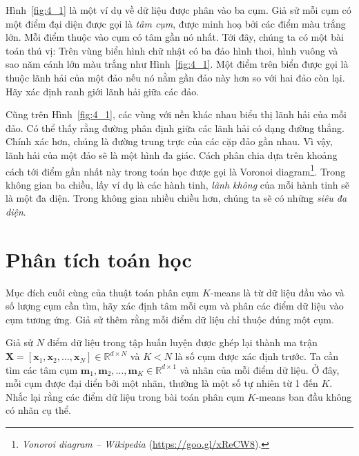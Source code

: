 Hình~\ref{fig:4_1} là một ví dụ về dữ liệu được phân vào ba cụm. Giả sử mỗi cụm
có một điểm đại diện được gọi là \textit{tâm cụm}, được minh hoạ bởi các điểm
màu trắng lớn. Mỗi điểm thuộc vào cụm có tâm gần nó nhất. Tới đây, chúng ta có
một bài toán thú vị: {Trên vùng biển hình chữ nhật có ba đảo hình thoi, hình
vuông và sao năm cánh lớn màu trắng như Hình~\ref{fig:4_1}. Một điểm trên biển
được gọi là thuộc lãnh hải của một đảo nếu nó nằm gần đảo này hơn so với hai đảo
còn lại. Hãy xác định ranh giới lãnh hải giữa các đảo.}

Cũng trên Hình~\ref{fig:4_1}, các vùng với nền khác nhau biểu thị lãnh hải của
mỗi đảo. Có thể thấy rằng đường phân định giữa các lãnh hải có dạng đường
thẳng. Chính xác hơn, chúng là đường trung trực của các cặp đảo gần nhau. Vì
vậy, lãnh hải của một đảo sẽ là một hình đa giác. Cách phân chia dựa trên khoảng
cách tới điểm gần nhất này trong toán học được gọi là Voronoi
diagram\footnote{\textit{Vonoroi diagram -- Wikipedia}
(\url{https://goo.gl/xReCW8}).}. Trong không gian ba chiều, lấy ví dụ là các
hành tinh, \textit{lãnh không} của mỗi hành tinh sẽ là một đa diện. Trong không
gian nhiều chiều hơn, chúng ta sẽ có những \textit{siêu đa diện}.




\section{Phân tích toán học }

Mục đích cuối cùng của thuật toán phân cụm $K$-means là từ dữ liệu đầu vào và số
lượng cụm cần tìm, hãy xác định tâm mỗi cụm và phân các điểm dữ liệu vào cụm
tương ứng. Giả sử thêm rằng mỗi điểm dữ liệu chỉ thuộc đúng một cụm.


Giả sử $N$ điểm dữ liệu trong tập huấn luyện được ghép lại thành ma trận $ \mathbf{X} =
[\mathbf{x}_1, \mathbf{x}_2, \dots,
\mathbf{x}_N] \in \mathbb{R}^{d \times N}$ và $K < N$ là số cụm được xác định trước. Ta cần tìm các tâm cụm $ \mathbf{m}_1, \mathbf{m}_2,
\dots, \mathbf{m}_K \in \mathbb{R}^{d \times 1}$ và nhãn của mỗi điểm dữ liệu.
Ở đây, mỗi cụm được đại diển bởi một nhãn, thường là một số tự nhiên từ 1
đến $K$. Nhắc lại rằng các điểm dữ liệu trong bài toán phân cụm $K$-means ban
đầu không có nhãn cụ thể. 

